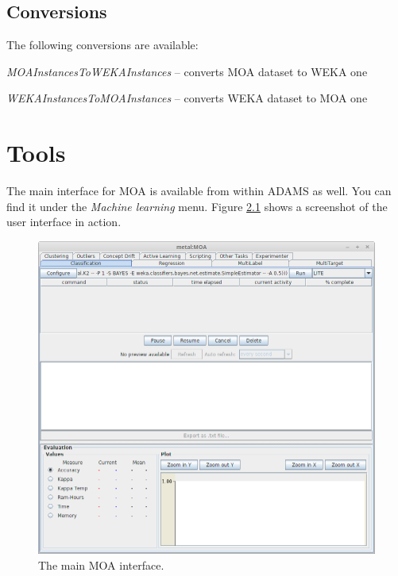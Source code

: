 \documentclass[a4paper]{book}
\begin{document}
\clearpage
\newpage
\section{Conversions}
The following conversions are available:
\begin{tight_itemize}
  \item \textit{MOAInstancesToWEKAInstances} -- converts MOA dataset to WEKA one
  \item \textit{WEKAInstancesToMOAInstances} -- converts WEKA dataset to MOA one
\end{tight_itemize}

\chapter{Tools}
The main interface for MOA is available from within ADAMS as well. You can
find it under the \textit{Machine learning} menu. Figure \ref{moa-gui} shows a screenshot
of the user interface in action.
\begin{figure}[htb]
  \centering
  \includegraphics[width=12.0cm]{images/moa-gui.png}
  \caption{The main MOA interface.}
  \label{moa-gui}
\end{figure}



\end{document}
